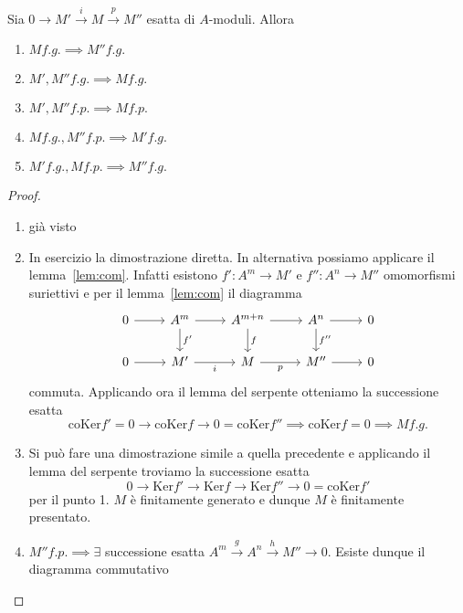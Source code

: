 \begin{proposition}{}
\label{prop:varie}
    Sia \(0 \to M' \overset{i}{\to } M \overset{p}{\to } M''\) esatta di
    \(A\)-moduli. Allora
\begin{enumerate}[label = \arabic*.]
    \item \(M f.g. \implies M'' f.g.\) 
    \item \(M', M'' f.g. \implies M f.g.\) 
    \item \(M', M'' f.p. \implies M f.p.\) 
    \item \(M f.g., M'' f.p. \implies M' f.g.\) 
    \item \(M' f.g., M f.p. \implies M'' f.g.\) 
\end{enumerate}
\end{proposition}
\begin{proof}{} \( \) 
\begin{enumerate}[label = \arabic*.]
    \item già visto
    \item In esercizio la dimostrazione diretta. In alternativa possiamo
        applicare il lemma~\ref{lem:com}. Infatti esistono \(f': A^{m} \to M'\) e \(f'' : A^{n} \to M''\) omomorfismi suriettivi e per il lemma~\ref{lem:com} il diagramma
\[\begin{tikzcd}
	0 & A^{m} & A^{m+n} & A^{n} & 0 \\
	0 & M' & M & M'' & 0
	\arrow[from=1-1, to=1-2]
	\arrow[from=1-2, to=1-3]
	\arrow["{f'}", from=1-2, to=2-2]
	\arrow[from=1-3, to=1-4]
	\arrow["f", from=1-3, to=2-3]
	\arrow[from=1-4, to=1-5]
	\arrow["{f''}", from=1-4, to=2-4]
	\arrow[from=2-1, to=2-2]
	\arrow["i"', from=2-2, to=2-3]
	\arrow["p"', from=2-3, to=2-4]
	\arrow[from=2-4, to=2-5]
\end{tikzcd}\]
    commuta. Applicando ora il lemma del serpente otteniamo la successione
    esatta 
    \[
      \mathrm{coKer}f' = 0 \to \mathrm{coKer}f \to  0= \mathrm{coKer} f'' \implies \mathrm{coKer} f = 0 \implies M f.g.
    \]
    \item Si può fare una dimostrazione simile a quella precedente e applicando
        il lemma del serpente troviamo la successione esatta
    \[
    0 \to \mathrm{Ker} f' \to \mathrm{Ker} f \to \mathrm{Ker}f'' \to 0 = \mathrm{coKer} f'
    \]
    per il punto 1. \(M\) è finitamente generato e dunque \(M\) è finitamente
    presentato.
    \item \(M'' f.p. \implies \exists \) successione esatta \(A^{m} \overset{g}{\to } A^{n} \overset{h}{\to }M'' \to 0\). Esiste dunque il diagramma commutativo

\end{enumerate}
\end{proof}

